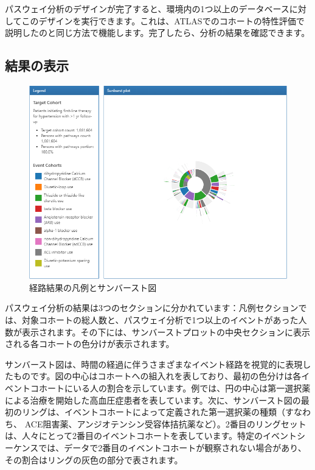 \documentclass[
  11pt]{book}
\theoremstyle{definition}
\theoremstyle{definition}
\theoremstyle{definition}
\theoremstyle{definition}
\theoremstyle{remark}
\begin{document}
パスウェイ分析のデザインが完了すると、環境内の1つ以上のデータベースに対してこのデザインを実行できます。これは、ATLASでのコホートの特性評価で説明したのと同じ方法で機能します。完了したら、分析の結果を確認できます。

\subsection{結果の表示}\label{ux7d50ux679cux306eux8868ux793a}

\begin{figure}

{\centering \includegraphics[width=1\linewidth]{images/Characterization/atlasPathwaysResults} 

}

\caption{経路結果の凡例とサンバースト図}\label{fig:atlasPathwaysResults}
\end{figure}

パスウェイ分析の結果は3つのセクションに分かれています：凡例セクションでは、対象コホートの総人数と、パスウェイ分析で1つ以上のイベントがあった人数が表示されます。その下には、サンバーストプロットの中央セクションに表示される各コホートの色分けが表示されます。

サンバースト図は、時間の経過に伴うさまざまなイベント経路を視覚的に表現したものです。図の中心はコホートへの組入れを表しており、最初の色分けは各イベントコホートにいる人の割合を示しています。例では、円の中心は第一選択薬による治療を開始した高血圧症患者を表しています。次に、サンバースト図の最初のリングは、イベントコホートによって定義された第一選択薬の種類（すなわち、 ACE阻害薬、アンジオテンシン受容体拮抗薬など）。2番目のリングセットは、人々にとって2番目のイベントコホートを表しています。特定のイベントシーケンスでは、データで2番目のイベントコホートが観察されない場合があり、その割合はリングの灰色の部分で表されます。
\end{document}
